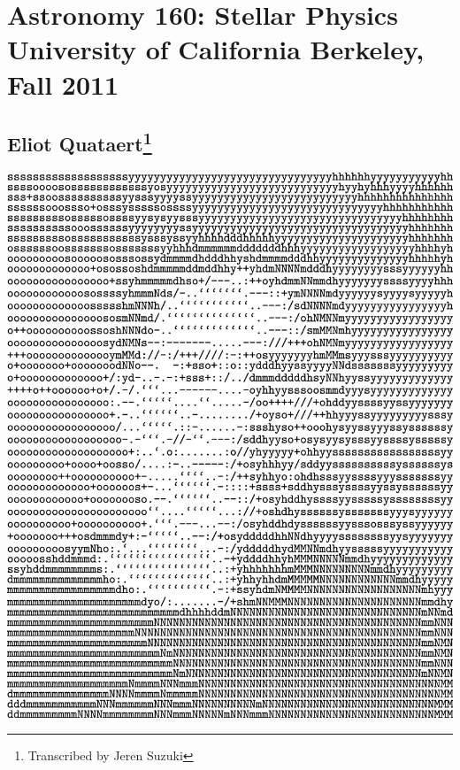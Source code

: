 \frontmatter
\chapter*{\center Astronomy 160: Stellar Physics \\ \Large{University of California Berkeley, Fall 2011}}
\section*{\huge \center Eliot Quataert\footnote{Transcribed by Jeren Suzuki}} 
\date{Updated \today}
\thispagestyle{empty}


\begin{center}
\includegraphics[width=\textwidth/2]{images/latex-image-1.eps}
\end{center}

\tableofcontents
%
%
\mainmatter